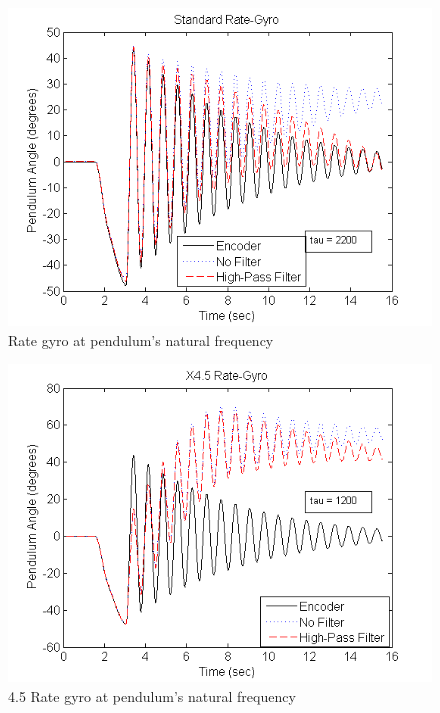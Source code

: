 \documentclass{article}
\theoremstyle{plain}
\theoremstyle{definition}
\theoremstyle{remark}
\begin{document}
\begin{figure}[hbt]
\begin{center}
\includegraphics[width = 12cm]{NormalMass_Gyro.png}
\caption{Rate gyro at pendulum's natural frequency}
\label{normal_gyro}
\end{center}
\end{figure}

\begin{figure}[hbt]
\begin{center}
\includegraphics[width = 12cm]{NormalMass_Gyro45.png}
\caption{4.5 Rate gyro at pendulum's natural frequency}
\label{normal_gyro45}
\end{center}
\end{figure}
\end{document}
